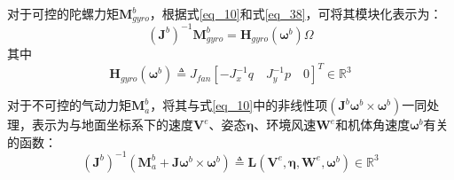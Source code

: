 对于可控的陀螺力矩$\boldsymbol{M}_{gyro}^b$，根据式\eqref{eq_10}和式\ref{eq_38}，可将其模块化表示为：
\begin{equation}
    (\boldsymbol{J}^b)^{-1}\boldsymbol{M}_{gyro}^b=\boldsymbol{H}_{gyro}(\boldsymbol{\omega}^b)\Omega
    \label{3-31}
\end{equation}
其中
\begin{equation}
    \boldsymbol{H}_{gyro}(\boldsymbol{\omega}^b) \triangleq J_{fan}[-J_x^{-1}q\quad J_y^{-1}p\quad0]^T\in\mathbb{R}^{3}
    \label{3-32}
\end{equation}

对于不可控的气动力矩$\boldsymbol{M}_{a}^b$，将其与式\eqref{eq_10}中的非线性项$(\boldsymbol{J}^b\boldsymbol{\omega}^b\times\boldsymbol{\omega}^b)$一同处理，表示为与地面坐标系下的速度$\boldsymbol{V}^e$、姿态$\boldsymbol{\eta}$、环境风速$\boldsymbol{W}^e$和机体角速度$\boldsymbol{\omega}^b$有关的函数：
\begin{equation}
    ({\boldsymbol{J}^b})^{-1}(\boldsymbol{M}_{a}^b+\boldsymbol{J}\boldsymbol{\omega}^b\times\boldsymbol{\omega}^b)\triangleq \boldsymbol{L}(\boldsymbol{V}^e,\boldsymbol{\eta},\boldsymbol{W}^e,\boldsymbol{\omega}^b)\in\mathbb{R}^3
    \label{3-33}
\end{equation}


